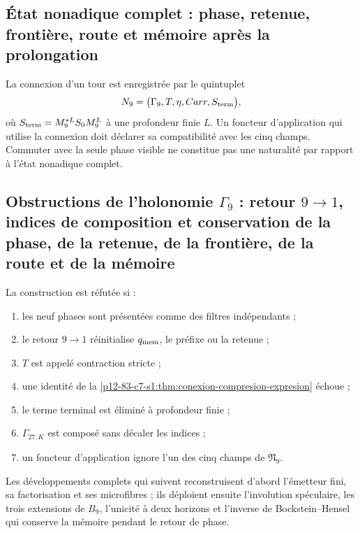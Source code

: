 \subsection{État nonadique complet : phase, retenue, frontière, route et mémoire après la prolongation}

La connexion d'un tour est enregistrée par le quintuplet
\[
 \mathfrak N_9=
 \bigl(\Gamma_9,T,\eta,\operatorname{Carr},S_{\rm term}\bigr),
\]
où \(S_{\rm term}=M_9^{*L}S_0M_9^L\) à une profondeur finie
\(L\). Un foncteur d'application qui utilise la connexion doit déclarer sa
compatibilité avec les cinq champs. Commuter avec la seule phase visible ne
constitue pas une naturalité par rapport à l'état nonadique complet.

\subsection{Obstructions de l'holonomie \(\Gamma_9\) : retour \(9\to1\), indices de composition et conservation de la phase, de la retenue, de la frontière, de la route et de la mémoire}

\begin{criterion}
La construction est réfutée si :
\begin{enumerate}
 \item les neuf phases sont présentées comme des filtres indépendants ;
 \item le retour \(9\to1\) réinitialise \(q_{\rm mem}\), le préfixe ou la retenue ;
 \item \(T\) est appelé contraction stricte ;
 \item une identité de la
       \cref{p12-83-c7-s1:thm:conexion-compresion-expresion} échoue ;
 \item le terme terminal est éliminé à profondeur finie ;
 \item \(\Gamma_{27,K}\) est composé sans décaler les indices ;
 \item un foncteur d'application ignore l'un des cinq champs de
       \(\mathfrak N_9\).
\end{enumerate}
\end{criterion}

Les développements complets qui suivent reconstruisent d'abord l'émetteur fini,
sa factorisation et ses microfibres ; ils déploient ensuite l'involution
spéculaire, les trois extensions de \(B_9\), l'unicité à deux horizons et
l'inverse de Bockstein--Hensel qui conserve la mémoire pendant le retour de phase.

\begin{HMTScientificOwnerSubordinated}

\end{HMTScientificOwnerSubordinated}

\begin{HMTScientificOwnerSubordinated}

\end{HMTScientificOwnerSubordinated}
